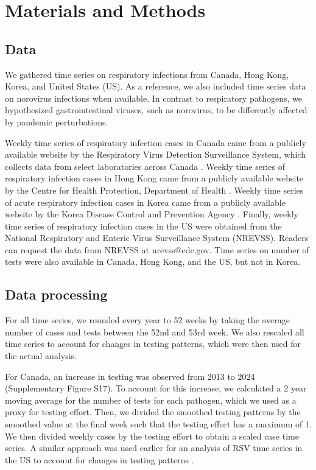 \documentclass[12pt]{article}
\begin{document}
\section*{Materials and Methods}

\subsection*{Data}

We gathered time series on respiratory infections from Canada, Hong Kong, Korea, and United States (US).
As a reference, we also included time series data on norovirus infections when available.
In contrast to respiratory pathogens, we hypothesized gastrointestinal viruses, such as norovirus, to be differently affected by pandemic perturbations.

Weekly time series of respiratory infection cases in Canada came from a publicly available website by the Respiratory Virus Detection Surveillance System, which collects data from select laboratories across Canada \citep{phac}.
Weekly time series of respiratory infection cases in Hong Kong came from a publicly available website by the Centre for Health Protection, Department of Health \citep{hkdata,hkdata2}.
Weekly time series of acute respiratory infection cases in Korea came from a publicly available website by the Korea Disease Control and Prevention Agency \citep{kordata}.
Finally, weekly time series of respiratory infection cases in the US were obtained from the National Respiratory and Enteric Virus Surveillance System (NREVSS). Readers can request the data from NREVSS at nrevss@cdc.gov.
Time series on number of tests were also available in Canada, Hong Kong, and the US, but not in Korea.

\subsection*{Data processing}

For all time series, we rounded every year to 52 weeks by taking the average number of cases and tests between the 52nd and 53rd week.
We also rescaled all time series to account for changes in testing patterns, which were then used for the actual analysis.

For Canada, an increase in testing was observed from 2013 to 2024 (Supplementary Figure S17).
To account for this increase, we calculated a 2 year moving average for the number of tests for each pathogen, which we used as a proxy for testing effort.
Then, we divided the smoothed testing patterns by the smoothed value at the final week such that the testing effort has a maximum of 1.
We then divided weekly cases by the testing effort to obtain a scaled case time series.
A similar approach was used earlier for an analysis of RSV time series in the US to account for changes in testing patterns \citep{pitzer2015environmental}.
\end{document}
